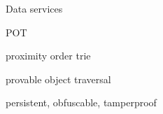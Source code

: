 \documentclass{beamer}
\begin{document}
\begin{section}{Data services}
\begin{frame}{}
\end{frame}


\begin{frame}{POT}
\begin{block}{}
proximity order trie
\end{block}
\begin{block}{}
provable object traversal
\end{block}
\begin{block}{}
persistent, obfuscable, tamperproof
\end{block}
\end{frame}






\end{section}
\end{document}
